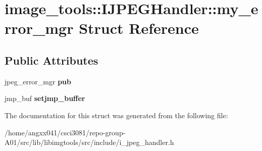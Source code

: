 \hypertarget{structimage__tools_1_1IJPEGHandler_1_1my__error__mgr}{}\section{image\+\_\+tools\+:\+:I\+J\+P\+E\+G\+Handler\+:\+:my\+\_\+error\+\_\+mgr Struct Reference}
\label{structimage__tools_1_1IJPEGHandler_1_1my__error__mgr}
\subsection*{Public Attributes}
\begin{DoxyCompactItemize}
\item 
jpeg\+\_\+error\+\_\+mgr {\bfseries pub}\hypertarget{structimage__tools_1_1IJPEGHandler_1_1my__error__mgr_a694c7e412f46360915c5fb04177be3d1}{}\label{structimage__tools_1_1IJPEGHandler_1_1my__error__mgr_a694c7e412f46360915c5fb04177be3d1}

\item 
jmp\+\_\+buf {\bfseries setjmp\+\_\+buffer}\hypertarget{structimage__tools_1_1IJPEGHandler_1_1my__error__mgr_a04d55d4d48759139292dd8ddfdd66b72}{}\label{structimage__tools_1_1IJPEGHandler_1_1my__error__mgr_a04d55d4d48759139292dd8ddfdd66b72}

\end{DoxyCompactItemize}


The documentation for this struct was generated from the following file\+:\begin{DoxyCompactItemize}
\item 
/home/angxx041/csci3081/repo-\/group-\/\+A01/src/lib/libimgtools/src/include/i\+\_\+jpeg\+\_\+handler.\+h\end{DoxyCompactItemize}
